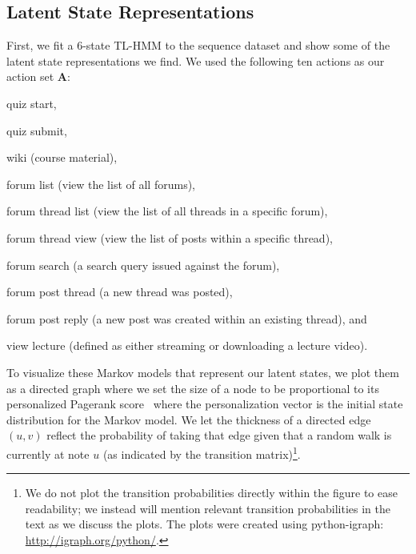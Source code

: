\subsection{Latent State Representations}
First, we fit a 6-state TL-HMM to the \textretrieval{} sequence dataset and
show some of the latent state representations we find. We used the
following ten actions as our action set $\mathbf{A}$:
\begin{enumerate*}[label=(\arabic*)]
  \item quiz start,
  \item quiz submit,
  \item wiki (course material),
  \item forum list (view the list of all forums),
  \item forum thread list (view the list of all threads in a specific
    forum),
  \item forum thread view (view the list of posts within a specific
    thread),
  \item forum search (a search query issued against the forum),
  \item forum post thread (a new thread was posted),
  \item forum post reply (a new post was created within an existing
    thread), and
  \item view lecture (defined as either streaming or downloading a lecture
    video).
\end{enumerate*}

To visualize these Markov models that represent our latent states, we plot
them as a directed graph where we set the size of a node to be proportional
to its personalized Pagerank score~\cite{Page:1999:PageRank, Jeh:2003:WWW}
where the personalization vector is the initial state distribution for the
Markov model. We let the thickness of a directed edge $(u, v)$ reflect the
probability of taking that edge given that a random walk is currently at
note $u$ (as indicated by the transition matrix)\footnote{We do not plot
the transition probabilities directly within the figure to ease
readability; we instead will mention relevant transition probabilities in
the text as we discuss the plots. The plots were created using
python-igraph: \url{http://igraph.org/python/}.}.

